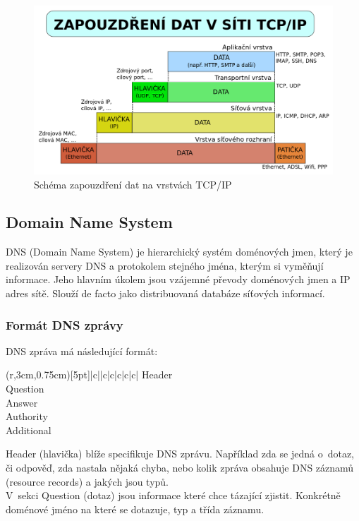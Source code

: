 \documentclass[11pt, a4paper, titlepage]{article}
\begin{document}
\begin{figure}[htp]
    \centering
    \includegraphics[width=.55\textwidth]{images/layers_schema.png}\hfill
    \caption{Schéma zapouzdření dat na vrstvách TCP/IP}
\end{figure}

\subsection{Domain Name System}

DNS (Domain Name System) je hierarchický systém doménových jmen, který je realizován servery DNS a protokolem stejného jména, kterým si vyměňují informace. Jeho hlavním úkolem jsou vzájemné převody doménových jmen a IP adres sítě. Slouží de facto jako distribuovaná databáze síťových informací.

\subsubsection{Formát DNS zprávy}

DNS zpráva má následující formát:

\begin{table}[H]
	\centering
	\begin{TAB}(r,3cm,0.75cm)[5pt]{|c|}{|c|c|c|c|c|}
		Header \\
		Question \\
		Answer \\
		Authority \\
		Additional \\
	\end{TAB}
\end{table}

Header (hlavička) blíže specifikuje DNS zprávu. Například zda se jedná o~dotaz, či odpověď, zda nastala nějaká chyba, nebo kolik zpráva obsahuje DNS záznamů (resource records) a jakých jsou typů. \\

V~sekci Question (dotaz) jsou informace které chce tázající zjistit. Konkrétně doménové jméno na které se dotazuje, typ a třída záznamu. \\
\end{document}
